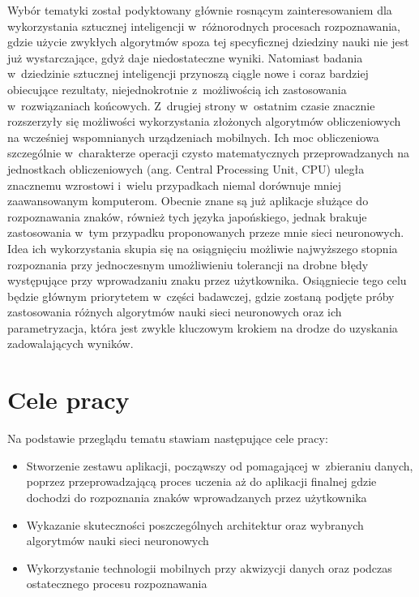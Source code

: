 Wybór tematyki został podyktowany głównie rosnącym zainteresowaniem dla wykorzystania sztucznej inteligencji w~różnorodnych procesach rozpoznawania, gdzie użycie zwykłych algorytmów spoza tej specyficznej dziedziny nauki nie jest już wystarczające, gdyż daje niedostateczne wyniki. Natomiast badania w~dziedzinie sztucznej inteligencji przynoszą ciągle nowe i coraz bardziej obiecujące rezultaty, niejednokrotnie z~możliwością ich zastosowania w~rozwiązaniach końcowych. Z~drugiej strony w~ostatnim czasie znacznie rozszerzyły się możliwości wykorzystania złożonych algorytmów obliczeniowych na wcześniej wspomnianych urządzeniach mobilnych. Ich moc obliczeniowa szczególnie w~charakterze operacji czysto matematycznych przeprowadzanych na jednostkach obliczeniowych (ang. Central Processing Unit, CPU) uległa znacznemu wzrostowi i~wielu przypadkach niemal dorównuje mniej zaawansowanym komputerom.
Obecnie znane są już aplikacje służące do rozpoznawania znaków, również tych języka japońskiego, jednak brakuje zastosowania w~tym przypadku proponowanych przeze mnie sieci neuronowych. Idea ich wykorzystania skupia się na osiągnięciu możliwie najwyższego stopnia rozpoznania przy jednoczesnym umożliwieniu tolerancji na drobne błędy występujące przy wprowadzaniu znaku przez użytkownika. Osiągniecie tego celu będzie głównym priorytetem w~części badawczej, gdzie zostaną podjęte próby zastosowania różnych algorytmów nauki sieci neuronowych oraz ich parametryzacja, która jest zwykle kluczowym krokiem na drodze do uzyskania zadowalających wyników. 


\section{Cele pracy}\label{sec:cele_pracy}
Na podstawie przeglądu tematu stawiam następujące cele pracy:

\begin{itemize}
 \item Stworzenie zestawu aplikacji, począwszy od pomagającej w~zbieraniu danych, poprzez przeprowadzającą proces uczenia aż do aplikacji finalnej gdzie dochodzi do rozpoznania znaków wprowadzanych przez użytkownika
 \item Wykazanie skuteczności poszczególnych architektur oraz wybranych algorytmów nauki sieci neuronowych
 \item Wykorzystanie technologii mobilnych przy akwizycji danych oraz podczas ostatecznego procesu rozpoznawania
\end{itemize}


